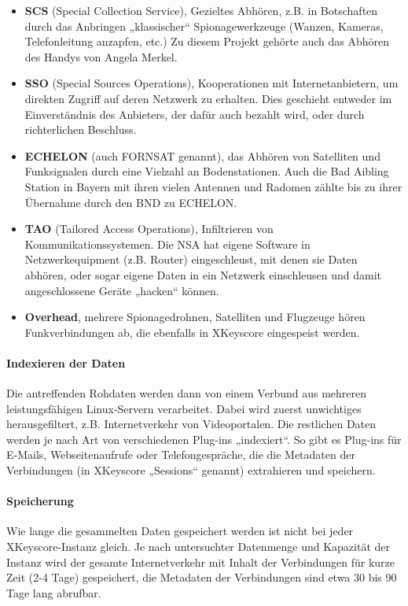 \documentclass[12pt,a4paper]{scrartcl}
\begin{document}
\begin{itemize}
\item \textbf{SCS} (Special Collection Service), Gezieltes Abhören, z.B. in Botschaften durch das Anbringen „klassischer“ Spionagewerkzeuge (Wanzen, Kameras, Telefonleitung anzapfen, etc.) Zu diesem Projekt gehörte auch das Abhören des Handys von Angela Merkel.

\item \textbf{SSO} (Special Sources Operations), Kooperationen mit Internetanbietern, um direkten Zugriff auf deren Netzwerk zu erhalten. Dies geschieht entweder im Einverständnis des Anbieters, der dafür auch bezahlt wird, oder durch richterlichen Beschluss.

\item \textbf{ECHELON} (auch FORNSAT genannt), das Abhören von Satelliten und Funksignalen durch eine Vielzahl an Bodenstationen. Auch die Bad Aibling Station in Bayern mit ihren vielen Antennen und Radomen zählte bis zu ihrer Übernahme durch den BND zu ECHELON.

\item \textbf{TAO} (Tailored Access Operations), Infiltrieren von Kommunikationssystemen. Die NSA hat eigene Software in Netzwerkequipment (z.B. Router) eingeschleust, mit denen sie Daten abhören, oder sogar eigene Daten in ein Netzwerk einschleusen und damit angeschlossene Geräte „hacken“ können.

\item \textbf{Overhead}, mehrere Spionagedrohnen, Satelliten und Flugzeuge hören Funkverbindungen ab, die ebenfalls in XKeyscore eingespeist werden.
\end{itemize}

\paragraph{Indexieren der Daten}
Die antreffenden Rohdaten werden dann von einem Verbund aus mehreren leistungsfähigen Linux-Servern verarbeitet. Dabei wird zuerst unwichtiges herausgefiltert, z.B. Internetverkehr von Videoportalen. Die restlichen Daten werden je nach Art von verschiedenen Plug-ins „indexiert“. So gibt es Plug-ins für E-Mails, Webseitenaufrufe oder Telefongespräche, die die Metadaten der Verbindungen (in XKeyscore „Sessions“ genannt) extrahieren und speichern.

\paragraph{Speicherung}
Wie lange die gesammelten Daten gespeichert werden ist nicht bei jeder XKeyscore-Instanz gleich. Je nach untersuchter Datenmenge und Kapazität der Instanz wird der gesamte Internetverkehr mit Inhalt der Verbindungen für kurze Zeit (2-4 Tage) gespeichert, die Metadaten der Verbindungen sind etwa 30 bis 90 Tage lang abrufbar.
\end{document}
